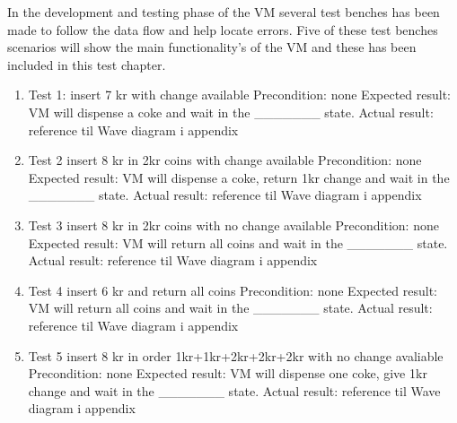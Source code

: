 In the development and testing phase of the VM several test benches has been made to follow the data flow and help locate errors.
Five of these test benches scenarios will show the main functionality's of the VM and these has been included in this test chapter.   

\begin{enumerate}

\item Test 1:  insert 7 kr with change available %
Precondition: none
Expected result: VM will dispense a coke and wait in the _______ state.
Actual result: 
reference til Wave diagram i appendix

\item Test 2 insert 8 kr in 2kr coins with change available %
Precondition:  none
Expected result:  VM will dispense a coke, return 1kr change and wait in the _______ state.
Actual result: 
reference til Wave diagram i appendix

\item Test 3 insert 8 kr in 2kr coins with no change available %
Precondition:  none
Expected result: VM will return all coins and wait in the _______ state.
Actual result: 
reference til Wave diagram i appendix

\item Test 4 insert 6 kr and return all coins %
Precondition:  none
Expected result: VM will return all coins and wait in the _______ state.
Actual result: 
reference til Wave diagram i appendix

\item Test 5 insert 8 kr in order 1kr+1kr+2kr+2kr+2kr with no change avaliable %
Precondition:  none
Expected result: VM will dispense one coke, give 1kr change and wait in the _______ state. 
Actual result: 
reference til Wave diagram i appendix

\end{enumerate}